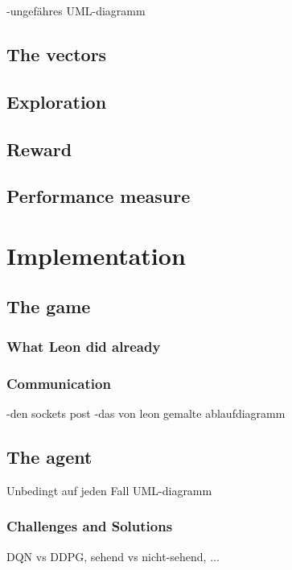 -ungefähres UML-diagramm

\subsection{The vectors}

\subsection{Exploration}

\subsection{Reward}

\subsection{Performance measure}

\section{Implementation}

\subsection{The game}

\subsubsection{What Leon did already}

\subsubsection{Communication}

-den sockets post
-das von leon gemalte ablaufdiagramm

\subsection{The agent}

Unbedingt auf jeden Fall UML-diagramm

\subsubsection{Challenges and Solutions}

DQN vs DDPG, sehend vs nicht-sehend, ...

